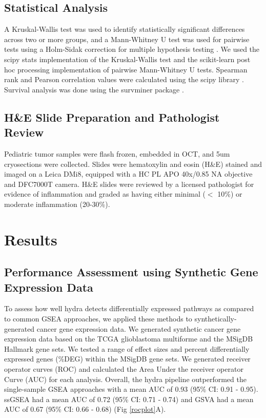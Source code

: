 \documentclass[10pt,letterpaper]{article}
\begin{document}
\subsection{Statistical Analysis}
A Kruskal-Wallis test was used to identify statistically significant differences across two or more groups, and a Mann-Whitney U test was used for pairwise tests using a Holm-Sidak correction for multiple hypothesis testing \cite{pedregosa2011scikit,jonesSciPyOpenSource2001}. We used the scipy stats implementation of the Kruskal-Wallis test and the scikit-learn post hoc processing implementation of pairwise Mann-Whitney U tests. Spearman rank and Pearson correlation values were calculated using the scipy library \cite{jonesSciPyOpenSource2001}. Survival analysis was done using the survminer package \cite{kassambaraSurvminerDrawingSurvival2019}. 

\subsection{H\&E Slide Preparation and Pathologist Review}
Pediatric tumor samples were flash frozen, embedded in OCT, and 5um cryosections were collected. Slides were hematoxylin and eosin (H\&E) stained and imaged on a Leica DMi8, equipped with a HC PL APO 40x/0.85 NA objective and DFC7000T camera. H\&E slides were reviewed by a licensed pathologist for evidence of inflammation and graded as having either minimal ($<$ 10\%) or moderate inflammation (20-30\%).


\section*{Results}
\subsection{Performance Assessment using Synthetic Gene Expression Data}
To assess how well hydra detects differentially expressed pathways as compared to common GSEA approaches, we applied these methods to synthetically-generated cancer gene expression data. We generated synthetic cancer gene expression data based on the TCGA glioblastoma multiforme and the MSigDB Hallmark gene sets. We tested a range of effect sizes and percent differentially expressed genes (\%DEG) within the MSigDB gene sets. We generated receiver operator curves (ROC) and calculated the Area Under the receiver operator Curve (AUC) for each analysis. Overall, the hydra pipeline outperformed the single-sample GSEA approaches with a mean AUC of 0.93 (95\% CI: 0.91 - 0.95). ssGSEA had a mean AUC of 0.72 (95\% CI: 0.71 - 0.74) and GSVA had a mean AUC of 0.67 (95\% CI: 0.66 - 0.68) (Fig \ref{rocplot}A).
\end{document}
